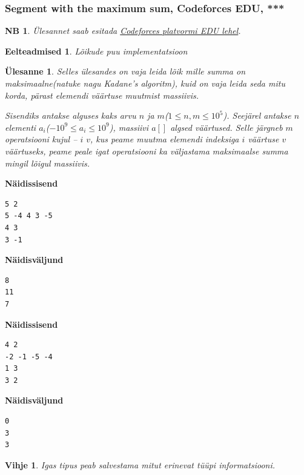 \documentclass{trkut}
\newtheorem*{prereq}{Eelteadmised}
\newtheorem*{extra}{NB}
\newtheorem*{vihje}{Vihje}
\newtheorem*{Text}{Ülesanne}
\begin{document}
\subsubsection{Segment with the maximum sum, Codeforces EDU,  ***}
\begin{extra}
Ülesannet saab esitada \href{https://codeforces.com/edu/course/2/lesson/4/2/practice/contest/273278/problem/A}{Codeforces platvormi EDU lehel}.
\end{extra}
\begin{prereq}
Lõikude puu implementatsioon
\end{prereq}
\begin{Text}
Selles ülesandes on vaja leida lõik mille summa on maksimaalne(natuke nagu Kadane's algoritm), kuid on vaja leida seda mitu korda, pärast elemendi väärtuse muutmist massiivis.

Sisendiks antakse alguses kaks arvu $n$ ja $m$($1\le n, m\le 10^5$).
Seejärel antakse $n$ elementi $a_i$($-10^9\le a_i\le 10^9$), massiivi $a[]$ algsed väärtused.
Selle järgneb $m$ operatsiooni kujul -- $i$ $v$, kus peame muutma elemendi indeksiga $i$ väärtuse $v$ väärtuseks, peame peale igat operatsiooni ka väljastama maksimaalse summa mingil lõigul massiivis. 

\parencite{9}
\end{Text}



\textbf{Näidissisend}

\begin{verbatim}
5 2
5 -4 4 3 -5
4 3
3 -1
\end{verbatim}

\textbf{Näidisväljund}

\begin{verbatim}
8
11
7
\end{verbatim}



\textbf{Näidissisend}

\begin{verbatim}
4 2
-2 -1 -5 -4
1 3
3 2
\end{verbatim}

\textbf{Näidisväljund}

\begin{verbatim}
0
3
3
\end{verbatim}


\begin{vihje}
Igas tipus peab salvestama mitut erinevat tüüpi informatsiooni.
\end{vihje}
\end{document}
